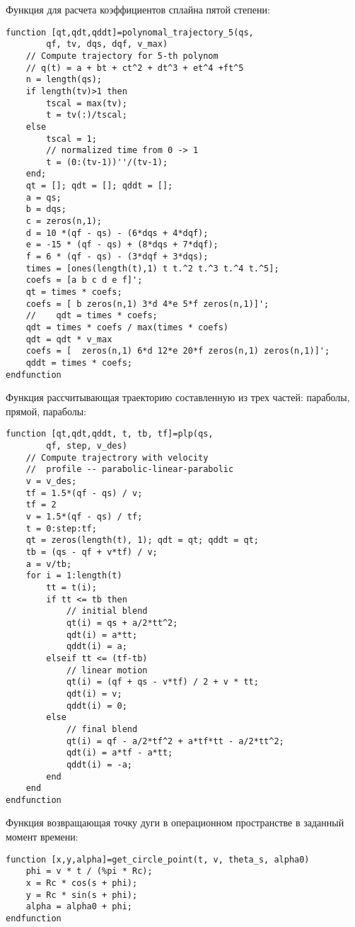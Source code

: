 Функция для расчета коэффициентов сплайна пятой степени:
\begin{lstlisting}
function [qt,qdt,qddt]=polynomal_trajectory_5(qs, 
		qf, tv, dqs, dqf, v_max)
	// Compute trajectory for 5-th polynom
	// q(t) = a + bt + ct^2 + dt^3 + et^4 +ft^5
	n = length(qs);
	if length(tv)>1 then
		tscal = max(tv);
		t = tv(:)/tscal;
	else
		tscal = 1;
		// normalized time from 0 -> 1
		t = (0:(tv-1))''/(tv-1); 
	end;
	qt = []; qdt = []; qddt = [];
	a = qs;
	b = dqs;
	c = zeros(n,1);
	d = 10 *(qf - qs) - (6*dqs + 4*dqf); 
	e = -15 * (qf - qs) + (8*dqs + 7*dqf);
	f = 6 * (qf - qs) - (3*dqf + 3*dqs);
	times = [ones(length(t),1) t t.^2 t.^3 t.^4 t.^5];
	coefs = [a b c d e f]';
	qt = times * coefs;
	coefs = [ b zeros(n,1) 3*d 4*e 5*f zeros(n,1)]';
	//    qdt = times * coefs;
	qdt = times * coefs / max(times * coefs)
	qdt = qdt * v_max
	coefs = [  zeros(n,1) 6*d 12*e 20*f zeros(n,1) zeros(n,1)]';
	qddt = times * coefs;
endfunction
\end{lstlisting}

Функция рассчитывающая траекторию составленную из трех частей: параболы, прямой, параболы:
\begin{lstlisting}
function [qt,qdt,qddt, t, tb, tf]=plp(qs, 
		qf, step, v_des)
	// Compute trajectrory with velocity 
	//  profile -- parabolic-linear-parabolic
	v = v_des;
	tf = 1.5*(qf - qs) / v; 
	tf = 2
	v = 1.5*(qf - qs) / tf; 
	t = 0:step:tf;
	qt = zeros(length(t), 1); qdt = qt; qddt = qt;
	tb = (qs - qf + v*tf) / v;
	a = v/tb;
	for i = 1:length(t)
		tt = t(i);
		if tt <= tb then
			// initial blend
			qt(i) = qs + a/2*tt^2;
			qdt(i) = a*tt;
			qddt(i) = a;
		elseif tt <= (tf-tb)
			// linear motion
			qt(i) = (qf + qs - v*tf) / 2 + v * tt;
			qdt(i) = v;
			qddt(i) = 0;
		else
			// final blend
			qt(i) = qf - a/2*tf^2 + a*tf*tt - a/2*tt^2;
			qdt(i) = a*tf - a*tt;
			qddt(i) = -a;
		end
	end
endfunction
\end{lstlisting}

Функция возвращающая точку дуги в операционном пространстве в заданный момент времени:
\begin{lstlisting}
function [x,y,alpha]=get_circle_point(t, v, theta_s, alpha0)
	phi = v * t / (%pi * Rc);
	x = Rc * cos(s + phi);
	y = Rc * sin(s + phi);
	alpha = alpha0 + phi;
endfunction
\end{lstlisting}